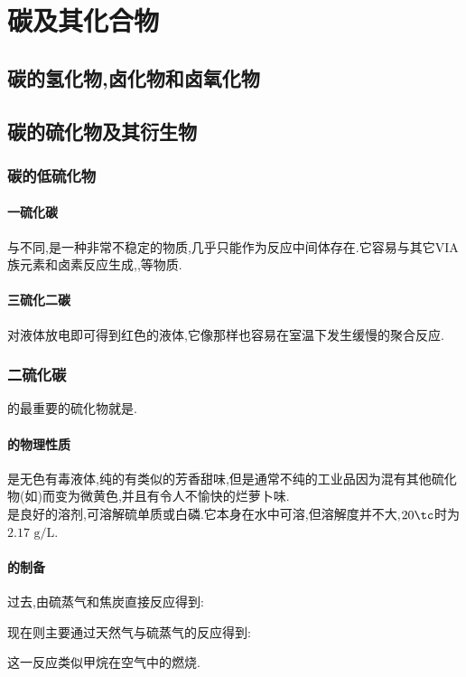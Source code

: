 \documentclass{ctexart}
\begin{document}
\section{碳及其化合物}
\subsection{碳的氢化物,卤化物和卤氧化物}
\subsection{碳的硫化物及其衍生物}
\subsubsection{碳的低硫化物}
\paragraph{一硫化碳}
与不同,是一种非常不稳定的物质,几乎只能作为反应中间体存在.它容易与其它VIA族元素和卤素反应生成,,等物质.
\paragraph{三硫化二碳}
对液体放电即可得到红色的液体,它像那样也容易在室温下发生缓慢的聚合反应.
\subsubsection{二硫化碳}
的最重要的硫化物就是.
\paragraph{的物理性质}
是无色有毒液体,纯的有类似的芳香甜味,但是通常不纯的工业品因为混有其他硫化物(如)而变为微黄色,并且有令人不愉快的烂萝卜味.\\
\indent {}是良好的溶剂,可溶解硫单质或白磷.它本身在水中可溶,但溶解度并不大,$20\tc$时为$2.17\text{ g/L}$.
\paragraph{的制备}
过去,由硫蒸气和焦炭直接反应得到:
\begin{center}
\end{center}
现在则主要通过天然气与硫蒸气的反应得到:
\begin{center}
\end{center}
这一反应类似甲烷在空气中的燃烧.
\end{document}
